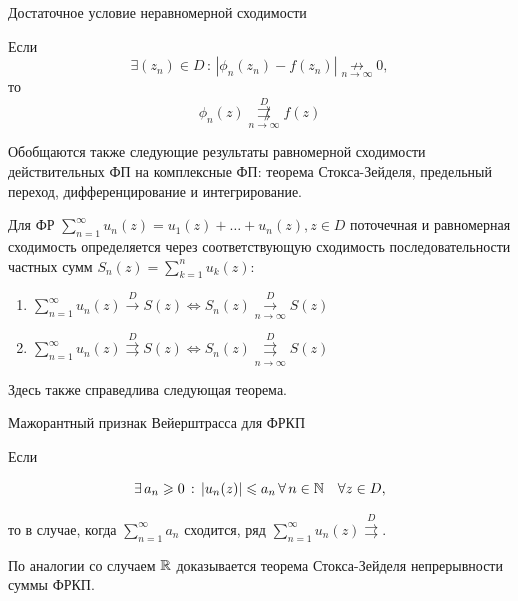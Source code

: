 \documentclass[../../main.tex]{subfiles}
\begin{document}
\begin{thm}{Достаточное условие неравномерной сходимости}
	\;
	
	Если
	\[ \exists (z_n) \in D\, :\, |\phi_n(z_n) - f(z_n)| \underset{n \to 
	\infty}{\not \rightarrow} 0, \]
	то
	\[ \phi_n(z) \overset{D}{\underset{n \to \infty}{\not \rightrightarrows}} 
	f(z) \]
\end{thm}

Обобщаются также следующие результаты равномерной сходимости действительных ФП 
на комплексные ФП: теорема Стокса-Зейделя, предельный переход, 
дифференцирование и интегрирование.

Для ФР $ \sum\limits_{n = 1}^{\infty} u_n(z) = u_1(z) + \ldots + u_n(z), z \in 
D $ поточечная и равномерная сходимость определяется через соответствующую 
сходимость последовательности частных сумм $ S_n(z) = \sum\limits_{k = 1}^{n} 
u_k(z): $

\begin{enumerate}
	\item $ \sum\limits_{n = 1}^{\infty} u_n(z) \overset{D}{\longrightarrow} S(z) 
	\iff S_n(z) \overset{D}{\underset{n \to \infty}\longrightarrow} S(z) $
	
	\item $ \sum\limits_{n = 1}^{\infty} u_n(z) \overset{D}\rightrightarrows S(z) 
	\iff S_n(z) \overset{D}{\underset{n \to \infty}\rightrightarrows} S(z) $
\end{enumerate}

Здесь также справедлива следующая теорема.

\begin{thm}{Мажорантный признак Вейерштрасса для ФРКП}
	\;
	
	Если
	
	\[ \exists\, a_n \geqslant 0\, :\, |u_n(z)| \leqslant a_n\, \forall\, n \in \mathbb{N} \quad 
	\forall z \in D, \]
	
	то в случае, когда $ \sum\limits_{n = 1}^{\infty} a_n $ сходится, ряд $ 
	\sum\limits_{n = 1}^{\infty} u_n(z) \overset{D}\rightrightarrows $.
\end{thm}

По аналогии со случаем $\mathbb{R}$ доказывается теорема Стокса-Зейделя непрерывности 
суммы ФРКП.
\end{document}
